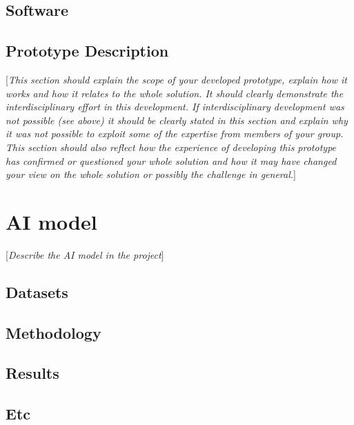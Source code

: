 \documentclass[10pt,english, openany]{book}
\begin{document}
\section{Software}
\section{Prototype Description}
[\textit{This section should explain the scope of your developed prototype, explain how it works and how it relates to the whole solution. It should clearly demonstrate the interdisciplinary effort in this development. If interdisciplinary development was not possible (see above) it should be clearly stated in this section and explain why it was not possible to exploit some of the expertise from members of your group. This section should also reflect how the experience of developing this prototype has confirmed or questioned your whole solution and how it may have changed your view on the whole solution or possibly the challenge in general.}]

\chapter{AI model}\label{chapt:model}
[\textit{Describe the AI model in the project}]
\section{Datasets}
\section{Methodology}
\section{Results}
\section{Etc}
\end{document}
